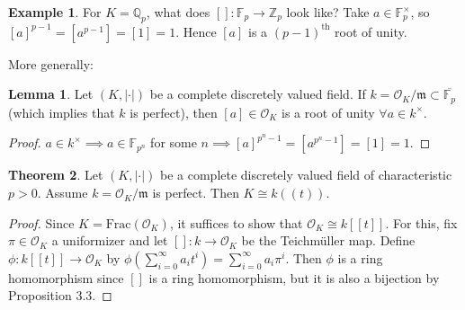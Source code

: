 \documentclass{article}
\theoremstyle{definition}
\newtheorem{theorem}{Theorem}[section]
\newtheorem{lemma}[theorem]{Lemma}
\newtheorem{example}{Example}[section]
\begin{document}
\begin{example}
    For $K=\mathbb{Q}_p$, what does $[]: \mathbb{F}_p \to \mathbb{Z}_p$ look like? Take $a \in \mathbb{F}_p^\times$, so $[a]^{p-1}=[a^{p-1}] = [1] = 1$. Hence $[a]$ is a $(p-1)^{\text{th}}$ root of unity.
\end{example}
More generally:
\begin{lemma}
    Let $(K,|\cdot|)$ be a complete discretely valued field. If $k = \mathcal{O}_K/\mathfrak{m} \subset \overline{\mathbb{F}_p}$ (which implies that $k$ is perfect), then $[a] \in \mathcal{O}_K$ is a root of unity $\forall a \in k^\times$.
\end{lemma}
\begin{proof}
    $a \in k^\times \implies a \in \mathbb{F}_{p^n}$ for some $n \implies [a]^{p^n-1}=[a^{p^n-1}] = [1] = 1$.
\end{proof}
\begin{theorem}
    Let $(K, |\cdot|)$ be a complete discretely valued field of characteristic $p > 0$. Assume $k = \mathcal{O}_K/\mathfrak{m}$ is perfect. Then $K \cong k((t))$.
\end{theorem}
\begin{proof}
    Since $K = \text{Frac}(\mathcal{O}_K)$, it suffices to show that $\mathcal{O}_K \cong k[[t]]$. For this, fix $\pi \in \mathcal{O}_K$ a uniformizer and let $[]: k \to \mathcal{O}_K$ be the Teichmüller map. Define $\phi : k[[t]] \to \mathcal{O}_K$ by $\phi\left(\sum_{i=0}^{\infty} a_i t^i \right) = \sum_{i=0}^{\infty} a_i \pi^i$. Then $\phi$ is a ring homomorphism since $[]$ is a ring homomorphism, but it is also a bijection by Proposition 3.3.
\end{proof}
\end{document}
